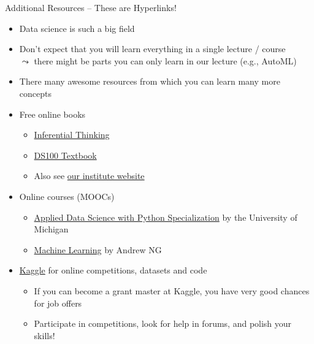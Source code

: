 \documentclass[aspectratio=169,handout]{../latex_main/tntbeamer}  %
\begin{document}
\begin{frame}[c]{Additional Resources -- These are Hyperlinks!}

\begin{itemize} 
  \item Data science is such a big field
  \item Don't expect that you will learn everything in a single lecture / course\\ $\leadsto$ there might be parts you can only learn in our lecture (e.g., AutoML)
  \item There many awesome resources from which you can learn many more concepts
  \pause
  \bigskip
  \item Free online books
  \begin{itemize}
    \item \href{https://inferentialthinking.com/chapters/intro.html}{Inferential Thinking}
      \item \href{https://www.textbook.ds100.org/intro.html}{DS100 Textbook}
      \item Also see \href{https://www.ai.uni-hannover.de/en/studies/recommended-literature}{our institute website}
\end{itemize}
  \pause
  \item Online courses (MOOCs)
  \begin{itemize}
      \item \href{https://www.coursera.org/specializations/data-science-python}{Applied Data Science with Python Specialization} by the University of Michigan
      \item \href{https://www.coursera.org/learn/machine-learning/home/welcome}{Machine Learning} by Andrew NG
  \end{itemize}
  \pause
  \item \href{https://www.kaggle.com/}{Kaggle} for online competitions, datasets and code
  \begin{itemize}
      \item If you can become a grant master at Kaggle, you have very good chances for job offers
      \item Participate in competitions, look for help in forums, and polish your skills!
  \end{itemize}
\end{itemize}

\end{frame}
\end{document}
